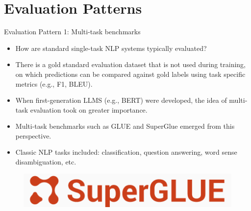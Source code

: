 \documentclass[handout]{beamer}
\begin{document}
\section{Evaluation Patterns}
\begin{frame}{Evaluation Pattern 1: Multi-task benchmarks }
\begin{scriptsize}
\begin{itemize}
\item How are standard single-task NLP systems typically evaluated?
\item There is a gold standard evaluation dataset that is not used during training, on which predictions can be compared against gold labels using task specific metrics (e.g., F1, BLEU).
\item When first-generation LLMS (e.g., BERT) were developed, the idea of multi-task evaluation took on greater importance.
\item Multi-task benchmarks such as GLUE and SuperGlue emerged from this perspective.
\item Classic NLP tasks included: classification, question answering, word sense disambiguation, etc. 
\end{itemize}
\end{scriptsize}
      \begin{figure}[h]
	\includegraphics[scale = 0.3]{pics/superglue.png}
\end{figure}

\end{frame}
\end{document}
